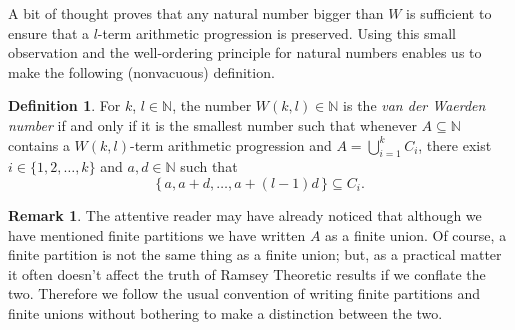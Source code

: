 \documentclass[12pt]{article}
\theoremstyle{plain}
\newtheorem*{roth}{Roth's Theorem}
\theoremstyle{definition}
\newtheorem*{defn}{Definition}
\newtheorem*{rmk}{Remark}
\newcommand{\bbN}{\mathbb{N}}
\begin{document}
A bit of thought proves that any
natural number bigger than $W$ is sufficient to ensure that a
$l$-term arithmetic progression is preserved.
Using this small observation and the well-ordering principle for
natural numbers enables us to make the following (nonvacuous) definition.

  \begin{defn}
    For $k$, $l \in \bbN$, the number $W(k,l) \in \bbN$ is the
    \textsl{van der Waerden number} if and only if it is the smallest
    number such that whenever $A \subseteq \bbN$ contains a $W(k,l)$-term
    arithmetic progression and $A = \bigcup_{i=1}^k C_i$, there exist
    $i \in \{1, 2, \ldots, k\}$ and $a, d \in \bbN$ such that
      \[
        \{\, a, a+d, \ldots, a+(l-1)d \,\} \subseteq C_i.
      \]
  \end{defn}

  \begin{rmk}
    The attentive reader may have already noticed that
    although we have mentioned finite partitions we have written $A$
    as a finite union.
    Of course, a finite partition is not the same thing as a finite
    union; but, as a practical matter it often doesn't affect the
    truth of Ramsey Theoretic results if we conflate the two. 
    Therefore we follow the usual convention of writing finite
    partitions and finite unions without bothering to make a
    distinction between the two.
  \end{rmk}





\end{document}
